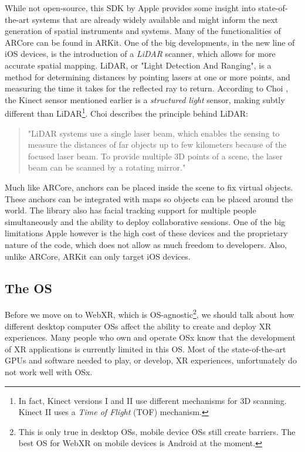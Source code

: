 While not open-source, this SDK by Apple provides some insight into state-of-the-art systems that are already widely available and might inform the next generation of spatial instruments and systems. Many of the functionalities of ARCore can be found in ARKit. One of the big developments, in the new line of iOS devices, is the introduction of a \textit{LiDAR} scanner, which allows for more accurate spatial mapping. LiDAR, or "Light Detection And Ranging", is a method for determining distances by pointing lasers at one or more points, and measuring the time it takes for the reflected ray to return. According to Choi \cite{choi2017range}, the Kinect sensor mentioned earlier is a \textit{structured light} sensor, making subtly different than LiDAR\footnote{In fact, Kinect versions I and II use different mechanisms for 3D scanning. Kinect II uses a \textit{Time of Flight} (TOF) mechanism.}. Choi describes the principle behind LiDAR:

\begin{quote}
    "LiDAR systems use a single laser beam, which enables the sensing to measure the distances of far objects up to few kilometers because of the focused laser beam. To provide multiple 3D points of a scene, the laser beam can be scanned by a rotating mirror."
\end{quote}

Much like ARCore, anchors can be placed inside the scene to fix virtual objects. These anchors can be integrated with maps so objects can be placed around the world. The library also has facial tracking support for multiple people simultaneously and the ability to deploy collaborative sessions. One of the big limitations Apple however is the high cost of these devices and the proprietary nature of the code, which does not allow as much freedom to developers. Also, unlike ARCore, ARKit can only target iOS devices. 

\subsection{The OS}

Before we move on to WebXR, which is OS-agnostic\footnote{This is only true in desktop OSs, mobile device OSs still create barriers. The best OS for WebXR on mobile devices is Android at the moment.}, we should talk about how different desktop computer OSs affect the ability to create and deploy XR experiences. Many people who own and operate OSx know that the development of XR applications is currently limited in this OS. Most of the state-of-the-art GPUs and software needed to play, or develop, XR experiences, unfortunately do not work well with OSx. 

